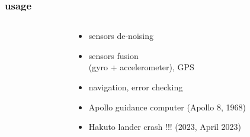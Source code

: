 \documentclass{beamer}
\begin{document}
\begin{frame}
  
  \frametitle{usage}    

    \begin{columns}

      \begin{column}{0.5\textwidth}
      \end{column}
  
      \begin{column}{0.5\textwidth}
        \begin{itemize}
          \item sensors de-noising 
          \item sensors fusion \\ (gyro + accelerometer), GPS
          \item navigation, error checking
          \item Apollo guidance computer (Apollo 8, 1968)
          \item Hakuto lander crash !!! (2023, April 2023)
        \end{itemize}
      \end{column}
  

\end{columns}
\end{frame}
\end{document}
